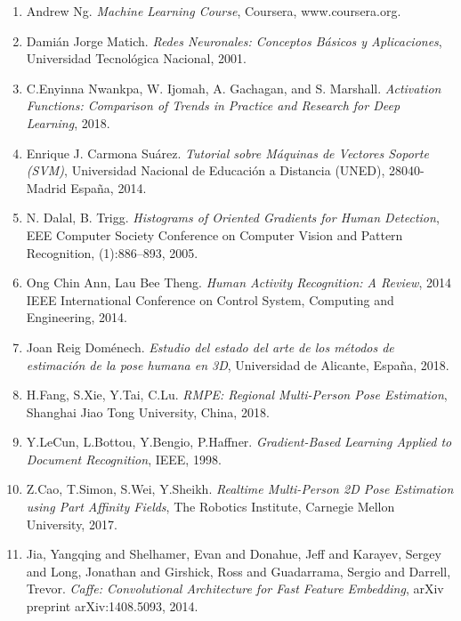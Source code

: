 \documentclass[a4paper,12pt,oneside,spanish]{book}
\begin{document}
\begin{enumerate}
	\item Andrew Ng. \textit{Machine Learning Course}, Coursera, www.coursera.org. 
	
	\item Damián Jorge Matich. \textit{Redes Neuronales: Conceptos Básicos y Aplicaciones}, Universidad Tecnológica Nacional, 2001. 
	
	\item C.Enyinna Nwankpa, W. Ijomah, A. Gachagan, and S. Marshall. \textit{Activation Functions: Comparison of Trends in Practice and Research for Deep Learning}, 2018.
	
	\item Enrique J. Carmona Suárez. \textit{Tutorial sobre Máquinas de Vectores Soporte (SVM)}, Universidad Nacional de Educación a Distancia (UNED), 28040-Madrid España, 2014.
	
	\item N. Dalal, B. Trigg. \textit{Histograms of Oriented Gradients for Human Detection}, EEE Computer Society Conference on Computer Vision and Pattern Recognition, (1):886–893, 2005.
	
	\item Ong Chin Ann, Lau Bee Theng. \textit{Human Activity Recognition: A Review}, 2014 IEEE International Conference on Control System, Computing and Engineering, 2014.
	
	\item Joan Reig Doménech. \textit{Estudio del estado del arte de los métodos de estimación de la pose humana en 3D}, Universidad de Alicante, España, 2018.
	
	\item H.Fang, S.Xie, Y.Tai, C.Lu. \textit{RMPE: Regional Multi-Person Pose Estimation}, Shanghai Jiao Tong University, China, 2018.
	
	\item Y.LeCun, L.Bottou, Y.Bengio, P.Haffner. \textit{Gradient-Based Learning Applied to Document Recognition}, IEEE, 1998.
	
	\item Z.Cao, T.Simon, S.Wei, Y.Sheikh. \textit{Realtime Multi-Person 2D Pose Estimation using Part Affinity Fields}, The Robotics Institute, Carnegie Mellon University, 2017.

	\item Jia, Yangqing and Shelhamer, Evan and Donahue, Jeff and Karayev, Sergey and Long, Jonathan and Girshick, Ross and Guadarrama, Sergio and Darrell, Trevor. \textit{Caffe: Convolutional Architecture for Fast Feature Embedding}, arXiv preprint arXiv:1408.5093, 2014.
	

\end{enumerate}
\end{document}
